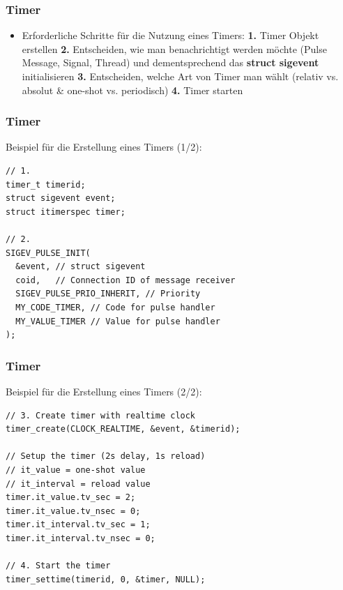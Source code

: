 \documentclass{beamer}
\begin{document}
\begin{frame}[fragile]
 \frametitle{Timer}
 \begin{itemize}
  \item Erforderliche Schritte f\"ur die Nutzung eines Timers:\newline\newline
  \textbf{1.} Timer Objekt erstellen\newline\newline
  \textbf{2.} Entscheiden, wie man benachrichtigt werden m\"ochte (Pulse Message, Signal, Thread) und dementsprechend das \textbf{struct sigevent} initialisieren\newline\newline
  \textbf{3.} Entscheiden, welche Art von Timer man w\"ahlt (relativ vs. absolut \& one-shot vs. periodisch)\newline\newline
  \textbf{4.} Timer starten
 \end{itemize}
\end{frame}

\begin{frame}[fragile]
 \frametitle{Timer}
 Beispiel f\"ur die Erstellung eines Timers (1/2):
 \begin{lstlisting}
// 1.
timer_t timerid;
struct sigevent event;
struct itimerspec timer;

// 2.
SIGEV_PULSE_INIT(
  &event, // struct sigevent
  coid,   // Connection ID of message receiver
  SIGEV_PULSE_PRIO_INHERIT, // Priority
  MY_CODE_TIMER, // Code for pulse handler
  MY_VALUE_TIMER // Value for pulse handler
);
 \end{lstlisting}
\end{frame}

\begin{frame}[fragile]
 \frametitle{Timer}
 Beispiel f\"ur die Erstellung eines Timers (2/2):
 \begin{lstlisting}
// 3. Create timer with realtime clock
timer_create(CLOCK_REALTIME, &event, &timerid);

// Setup the timer (2s delay, 1s reload)
// it_value = one-shot value
// it_interval = reload value
timer.it_value.tv_sec = 2;
timer.it_value.tv_nsec = 0;
timer.it_interval.tv_sec = 1;
timer.it_interval.tv_nsec = 0;

// 4. Start the timer
timer_settime(timerid, 0, &timer, NULL);
 \end{lstlisting}
\end{frame}
\end{document}
